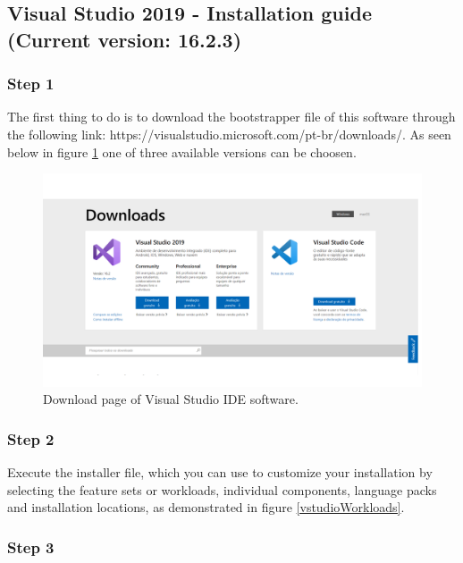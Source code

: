 \begin{refsection}
	\clearpage
	\subsection{Visual Studio 2019 - Installation guide (Current version: 16.2.3)}
	
	\subsubsection{Step 1}
	
	The first thing to do is to download the bootstrapper file of this software through the following link: https://visualstudio.microsoft.com/pt-br/downloads/. As seen below in figure \ref{vstudio} one of three available versions can be choosen.
	
	\begin{figure}[H]
		\centering
		\includegraphics[width=1\linewidth]{./sdf/arduino_quantum_rx/figures/vsDownload.pdf}
		\caption{Download page of Visual Studio IDE software.}
		\label{vstudio}
	\end{figure}
	
	
	\subsubsection{Step 2}
	
	Execute the installer file, which you can use to customize your installation by selecting the feature sets or workloads, individual components, language packs and installation locations, as demonstrated in figure \ref{vstudioWorkloads}.
	
	
	
	\subsubsection{Step 3}
	

\end{refsection}
